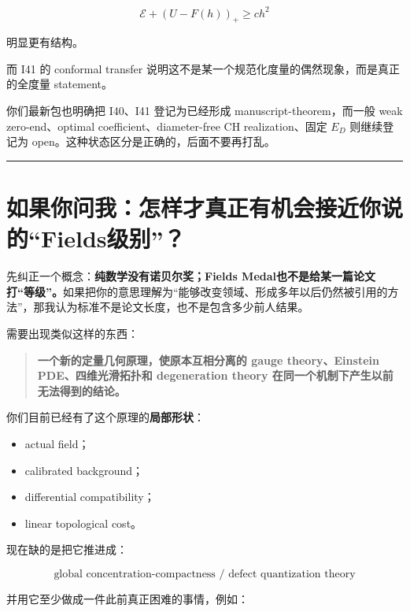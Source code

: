 \documentclass[
  10pt,
]{article}
\providecommand{\tightlist}{%
  \setlength{\itemsep}{0pt}\setlength{\parskip}{0pt}}
\begin{document}
\[
\mathcal E+(U-F(h))_+\ge ch^2
\]

明显更有结构。

而 I41 的 conformal transfer
说明这不是某一个规范化度量的偶然现象，而是真正的全度量 statement。

你们最新包也明确把 I40、I41 登记为已经形成 manuscript-theorem，而一般
weak zero-end、optimal coefficient、diameter-free CH realization、固定
\(E_D\) 则继续登记为 open。这种状态区分是正确的，后面不要再打乱。

\begin{center}\rule{0.5\linewidth}{0.5pt}\end{center}

\hypertarget{ux5982ux679cux4f60ux95eeux6211ux600eux6837ux624dux771fux6b63ux6709ux673aux4f1aux63a5ux8fd1ux4f60ux8bf4ux7684fieldsux7ea7ux522b}{%
\section{如果你问我：怎样才真正有机会接近你说的``Fields级别''？}\label{ux5982ux679cux4f60ux95eeux6211ux600eux6837ux624dux771fux6b63ux6709ux673aux4f1aux63a5ux8fd1ux4f60ux8bf4ux7684fieldsux7ea7ux522b}}

先纠正一个概念：\textbf{纯数学没有诺贝尔奖；Fields
Medal也不是给某一篇论文打``等级''。}如果把你的意思理解为``能够改变领域、形成多年以后仍然被引用的方法''，那我认为标准不是论文长度，也不是包含多少前人结果。

需要出现类似这样的东西：

\begin{quote}
\textbf{一个新的定量几何原理，使原本互相分离的 gauge theory、Einstein
PDE、四维光滑拓扑和 degeneration theory
在同一个机制下产生以前无法得到的结论。}
\end{quote}

你们目前已经有了这个原理的\textbf{局部形状}：

\begin{itemize}
\tightlist
\item
  actual field；
\item
  calibrated background；
\item
  differential compatibility；
\item
  linear topological cost。
\end{itemize}

现在缺的是把它推进成：

\[
\boxed{
\text{global concentration-compactness / defect quantization theory}
}
\]

并用它至少做成一件此前真正困难的事情，例如：
\end{document}
